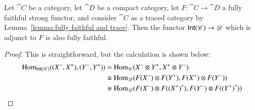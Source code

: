 \documentclass[12pt,oneside,article,draft]{memoir}
\begin{document}
\begin{lemma}\label{lemma:more fully faithfulness}
	Let $\cat{C}$ be a category, let $\cat{D}$ be a compact category, let $F\colon\cat{C}\to\cat{D}$ a fully faithful strong functor, and consider $\cat{C}$ as a traced category by Lemma~\ref{lemma:fully faithful and trace}.
	Then the functor $\mathsf{Int}(\mathscr{C})\to\mathscr{D}$ which is adjunct to $F$ is also fully faithful.
\end{lemma}
\begin{proof}
	This is straightforward, but the calculation is shown below:
	\begin{align*}
		\operatorname{Hom}_{\mathsf{Int}(\mathscr{C})}((X^-,X^+),(Y^-,Y^+))&=\operatorname{Hom}_{\mathscr{C}}(X^-\otimes Y^+,X^+\otimes Y^-) \\
		&\cong\operatorname{Hom}_{\mathscr{D}}(F(X^-)\otimes F(Y^+),F(X^+)\otimes F(Y^-)) \\
		&\cong\operatorname{Hom}_{\mathscr{D}}(F(X^-)\otimes F({(X^+)}^*),F(Y^-)\otimes F({(Y^+)}^*))
	\end{align*}
\end{proof}
\end{document}
